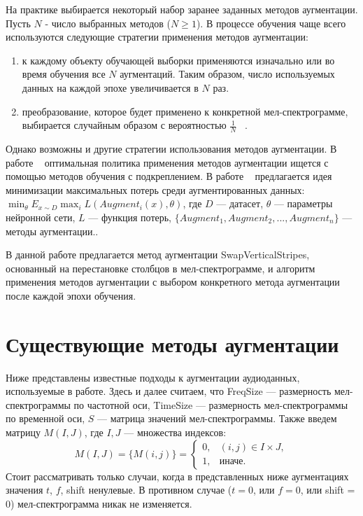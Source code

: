 \documentclass[12pt, fleqn]{article}
\begin{document}
На практике выбирается некоторый набор заранее заданных методов аугментации. Пусть $N$ - число выбранных методов ($N \geq 1$). В процессе обучения чаще всего используются следующие стратегии применения методов аугментации:
\begin{enumerate}
    \item к каждому объекту обучающей выборки применяются изначально или во время обучения все $N$ аугментаций. Таким образом, число используемых данных на каждой эпохе увеличивается в $N$ раз.
    \item преобразование, которое будет применено к конкретной мел-спектрограмме, выбирается случайным образом с вероятностью $\frac{1}{N}$ ~\cite{RandAugment}.
\end{enumerate}
Однако возможны и другие стратегии использования методов аугментации. В работе ~\cite{AutoAugment} оптимальная политика применения методов аугментации ищется с помощью методов обучения с подкреплением. В работе ~\cite{MaxUp} предлагается идея минимизации максимальных потерь среди аугментированных данных: \newline
$\min_{\theta} E_{x \sim D} \max_i L(Augment_i(x), \theta)$, где \newline
$D$ --- датасет, \newline
$\theta$ --- параметры нейронной сети, \newline
$L$ --- функция потерь, \newline
$\{Augment_1, Augment_2, ..., Augment_n\}$ --- методы аугментации..

В данной работе предлагается метод аугментации SwapVerticalStripes, основанный на перестановке столбцов в мел-спектрограмме, и алгоритм применения методов аугментации с выбором конкретного метода аугментации после каждой эпохи обучения.


\section{Существующие методы аугментации}
Ниже представлены известные подходы к аугментации аудиоданных, используемые в работе. 	
\newline Здесь и далее считаем, что \newline FreqSize --- размерность мел-спектрограммы по частотной оси, \newline TimeSize --- размерность мел-спектрограммы по временной оси, \newline
$S$ --- матрица значений мел-спектрограммы. \newline
Также введем матрицу $M(I, J)$, где $I, J$ --- множества индексов: \newline 
\begin{equation*}
M(I, J) = \{M(i, j)\} = 
\begin{cases}
0, & (i,j) \in I \times J,\\
1, &\text{иначе}.
\end{cases}
\end{equation*}
Стоит рассматривать только случаи, когда в представленных ниже аугментациях значения $t$, $f$, shift ненулевые. В противном случае ($t = 0$, или $f = 0$, или shift = 0) мел-спектрограмма никак не изменяется.
\end{document}
